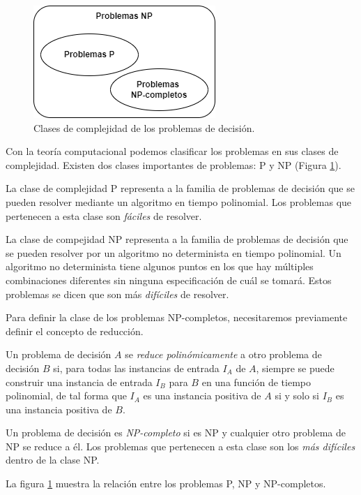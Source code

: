 \begin{figure}[H]   
	\center
	\includegraphics[scale=0.5]{figures/Complejidad.png}
	\caption{Clases de complejidad de los problemas de decisión.}
    \label{fg:complexity}
\end{figure}

Con la teoría computacional podemos clasificar los problemas en sus clases de complejidad. Existen dos clases importantes de problemas: P y NP (Figura \ref{fg:complexity}).

La clase de complejidad P representa a la familia de problemas de decisión que se pueden resolver mediante un algoritmo en tiempo polinomial. Los problemas que pertenecen a esta clase son \emph{fáciles} de resolver.

La clase de compejidad NP representa a la familia de problemas de decisión que se pueden resolver por un algoritmo no determinista en tiempo polinomial. Un algoritmo no determinista tiene algunos puntos en los que hay múltiples combinaciones diferentes sin ninguna especificación de cuál se tomará. Estos problemas se dicen que son más \emph{difíciles} de resolver.

Para definir la clase de los problemas NP-completos, necesitaremos previamente definir el concepto de reducción.

\begin{definition}
    Un problema de decisión $A$ se \emph{reduce polinómicamente} a otro problema de decisión $B$ si, para todas las instancias de entrada $I_A$ de $A$, siempre se puede construir una instancia de entrada $I_B$ para $B$ en una función de tiempo polinomial, de tal forma que $I_A$ es una instancia positiva de $A$ si y solo si $I_B$ es una instancia positiva de $B$.
\end{definition}

Un problema de decisión es \emph{NP-completo} si es NP y cualquier otro problema de NP se reduce a él. Los problemas que pertenecen a esta clase son los \emph{más difíciles} dentro de la clase NP.

La figura \ref{fg:complexity} muestra la relación entre los problemas P, NP y NP-completos.

